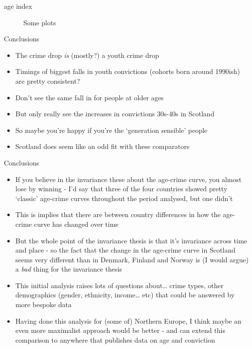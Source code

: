 \documentclass[
  ignorenonframetext,
]{beamer}
\providecommand{\tightlist}{%
  \setlength{\itemsep}{0pt}\setlength{\parskip}{0pt}}\usepackage{longtable,booktabs,array}
\begin{document}
\begin{frame}{age index}
\begin{figure}
\begin{minipage}[t]{0.50\linewidth}
{{}

}

\end{minipage}%

\caption{\label{fig-acc-index}Some plots}

\end{figure}
\end{frame}

\begin{frame}{Conclusions}
\protect\hypertarget{conclusions}{}
\begin{itemize}
\tightlist
\item
  The crime drop \emph{is} (mostly?) a youth crime drop
\item
  Timings of biggest falls in youth convictions (cohorts born around
  1990ish) are pretty consistent?
\item
  Don't see the same fall in for people at older ages
\item
  But only really see the increases in convictions 30s-40s in Scotland
\item
  So maybe you're happy if you're the `generation sensible' people
\item
  Scotland does seem like an odd fit with these comparators
\end{itemize}
\end{frame}

\begin{frame}{Conclusions}
\protect\hypertarget{conclusions-1}{}
\begin{itemize}
\tightlist
\item
  If you believe in the invariance these about the age-crime curve, you
  almost lose by winning - I'd say that three of the four countries
  showed pretty `classic' age-crime curves throughout the period
  analysed, but one didn't
\item
  This is implies that there are between country differences in how the
  age-crime curve has changed over time
\item
  But the whole point of the invariance thesis is that it's invariance
  across time and place - so the fact that the change in the age-crime
  curve in Scotland seems very different than in Denmark, Finland and
  Norway is (I would argue) a \emph{bad} thing for the invariance thesis
\item
  This initial analysis raises lots of questions about\ldots{} crime
  types, other demographics (gender, ethnicity, income\ldots{} etc) that
  could be answered by more bespoke data
\item
  Having done this analysis for (some of) Northern Europe, I think maybe
  an even more maximalist approach would be better - and can extend this
  comparison to anywhere that publishes data on age and conviction
\end{itemize}
\end{frame}
\end{document}
